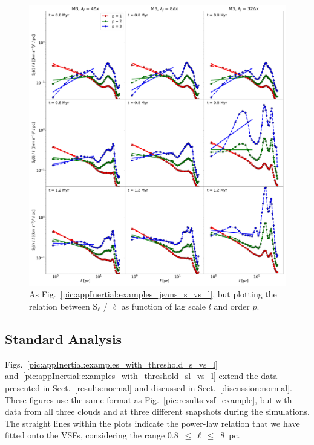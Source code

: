  	
\begin{figure}
    \centering
    \includegraphics[width=\textwidth]{app_examples_jeans_sl_l.pdf}
    \caption{
        As Fig.~\ref{pic:appInertial:examples_jeans_s_vs_l}, but plotting the relation between S$_{\ell}$ / $\ell$ as function of lag scale $l$ and order $p$.
    }
    \label{pic:appInertial:examples_jeans_sl_vs_l}
\end{figure}

\subsection{Standard Analysis}\label{Bsub:standard}

Figs.~\ref{pic:appInertial:examples_with_threshold_s_vs_l} and~\ref{pic:appInertial:examples_with_threshold_sl_vs_l} extend the data presented in Sect.~\ref{results:normal} and discussed in Sect.~\ref{discussion:normal}.
These figures use the same format as Fig.~\ref{pic:results:vsf_example}, but with data from all three clouds and at three different snapshots during the simulations.
The straight lines within the plots indicate the power-law relation that we have fitted onto the VSFs, considering the range 0.8~$\leq\,\ell\,\leq$~8~pc.

